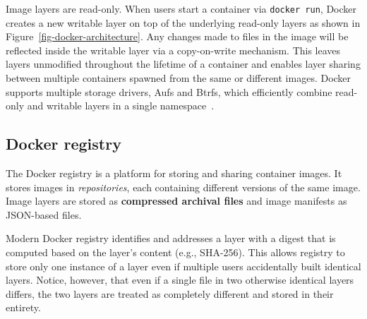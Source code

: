 Image layers are read-only.
%
When users start a container via {\tt docker run}, Docker creates a new
writable layer on top of the underlying read-only layers as shown in
Figure~\ref{fig-docker-architecture}.
%
Any changes made to files in the image will be reflected inside the writable
layer via a copy-on-write mechanism.
%
This leaves layers unmodified throughout the lifetime of a container and
enables layer sharing between multiple containers spawned from the same or
different images.
%
Docker supports multiple storage drivers, \eg Aufs and Btrfs, which efficiently
combine read-only and writable layers in a single
namespace~\cite{docker-driver-eval}.
%



\subsection{Docker registry}
\label{sec:docker-registry}

The Docker registry is a platform for storing and sharing container images.
%
It stores images in \emph{repositories}, each containing different versions of
the same image.
%
Image layers are stored as \textbf{compressed archival files} and image
manifests as JSON-based files.
%
%

Modern Docker registry identifies and addresses a layer with a digest that is
computed based on the layer's content (e.g., SHA-256).
%
This allows registry to store only one instance of a layer even if multiple
users accidentally built identical layers.
%
Notice, however, that even if a single file in two otherwise identical layers
differs, the two layers are treated as completely different and stored in their
entirety.
